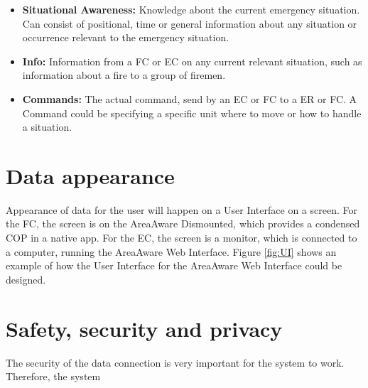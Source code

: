 \begin{itemize}
	\item \textbf{Situational Awareness:} Knowledge about the current emergency situation. Can consist of positional, time or general information about any situation or occurrence relevant to the emergency situation.
	\item \textbf{Info:} Information from a FC or EC on any current relevant situation, such as information about a fire to a group of firemen.
	\item \textbf{Commands:} The actual command, send by an EC or FC to a ER or FC. A Command could be specifying a specific unit where to move or how to handle a situation.
\end{itemize}

\newpage
\section{Data appearance}
Appearance of data for the user will happen on a User Interface on a screen. For the FC, the screen is on the AreaAware Dismounted, which provides a condensed COP in a native app. For the EC, the screen is a monitor, which is connected to a computer, running the AreaAware Web Interface. Figure \ref{fig:UI} shows an example of how the User Interface for the AreaAware Web Interface could be designed. 


\section{Safety, security and privacy}
The security of the data connection is very important for the system to work. Therefore, the system 






